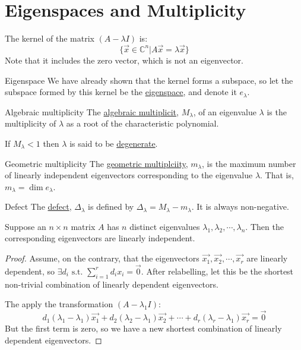 \documentclass[../Main.tex]{subfiles}
\begin{document}
\section{Eigenspaces and Multiplicity}
The kernel of the matrix $(A - \lambda I)$ is:
\begin{equation*}
\{\vec{x} \in \mathbb{C}^n | A\vec{x} = \lambda \vec{x}\}
\end{equation*}
Note that it includes the zero vector, which is not an eigenvector.
\begin{definition}{Eigenspace}
    We have already shown that the kernel forms a subspace, so let the subspace formed by this kernel be the \underline{eigenspace}, and denote it $e_\lambda$.
\end{definition}
\begin{definition}{Algebraic multiplicity}
    The \underline{algebraic multiplicit}, $M_\lambda$, of an eigenvalue $\lambda$ is the multiplicity of $\lambda$ as a root of the characteristic polynomial.
\end{definition}
If $M_\lambda < 1$ then $\lambda$ is said to be \underline{degenerate}.
\begin{definition}{Geometric multiplicity}
    The \underline{geometric multiplciity}, $m_\lambda$, is the maximum number of linearly independent eigenvectors corresponding to the eigenvalue $\lambda$. That is, $m_\lambda = \dim{e_\lambda}$.
\end{definition}
\begin{definition}{Defect}
    The \underline{defect}, $\Delta_\lambda$ is defined by $\Delta_\lambda = M_\lambda - m_\lambda$. It is always non-negative.
\end{definition}
\begin{theorem}
    Suppose an $n\times n$ matrix $A$ has $n$ distinct eigenvalues $\lambda_1, \lambda_2, \cdots, \lambda_n$. Then the corresponding eigenvectors are linearly independent.
    \label{thmLIEigenvectors}
\end{theorem}
\begin{proof}
Assume, on the contrary, that the eigenvectors $\vec{x_1}, \vec{x_2}, \cdots, \vec{x_r}$ are linearly dependent, so $\exists d_i \text{ s.t. } \sum_{i=1}^{r}d_i x_i = \vec{0}$. After relabelling, let this be the shortest non-trivial combination of linearly dependent eigenvectors.\par
The apply the transformation $(A - \lambda_1 I)$:
\begin{equation*}
    d_1(\lambda_1 - \lambda_1)\vec{x_1} + d_2(\lambda_2 - \lambda_1)\vec{x_2} + \cdots + d_r(\lambda_r - \lambda_1)\vec{x_r} = \vec{0}
\end{equation*}
But the first term is zero, so we have a new shortest combination of linearly dependent eigenvectors. \contradiction
\end{proof}
\end{document}
